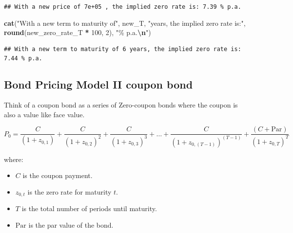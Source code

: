 \documentclass[
]{book}
\newenvironment{Shaded}{\begin{snugshade}}{\end{snugshade}}
\newcommand{\DecValTok}[1]{\textcolor[rgb]{0.00,0.00,0.81}{#1}}
\newcommand{\FunctionTok}[1]{\textcolor[rgb]{0.13,0.29,0.53}{\textbf{#1}}}
\newcommand{\NormalTok}[1]{#1}
\newcommand{\SpecialCharTok}[1]{\textcolor[rgb]{0.81,0.36,0.00}{\textbf{#1}}}
\newcommand{\StringTok}[1]{\textcolor[rgb]{0.31,0.60,0.02}{#1}}
\providecommand{\tightlist}{%
  \setlength{\itemsep}{0pt}\setlength{\parskip}{0pt}}
\begin{document}
\begin{verbatim}
## With a new price of 7e+05 , the implied zero rate is: 7.39 % p.a.
\end{verbatim}

\begin{Shaded}
\begin{Highlighting}[]
\FunctionTok{cat}\NormalTok{(}\StringTok{"With a new term to maturity of"}\NormalTok{, new\_T, }\StringTok{"years, the implied zero rate is:"}\NormalTok{, }\FunctionTok{round}\NormalTok{(new\_zero\_rate\_T }\SpecialCharTok{*} \DecValTok{100}\NormalTok{, }\DecValTok{2}\NormalTok{), }\StringTok{"\% p.a.}\SpecialCharTok{\textbackslash{}n}\StringTok{"}\NormalTok{)}
\end{Highlighting}
\end{Shaded}

\begin{verbatim}
## With a new term to maturity of 6 years, the implied zero rate is: 7.44 % p.a.
\end{verbatim}

\hypertarget{bond-pricing-model-ii-coupon-bond}{%
\subsection{Bond Pricing Model II coupon
bond}\label{bond-pricing-model-ii-coupon-bond}}

Think of a coupon bond as a series of Zero-coupon bonds where the coupon
is also a value like face value.

\[
P_0 = \frac{C}{(1 + z_{0,1})} + \frac{C}{(1 + z_{0,2})^2} + \frac{C}{(1 + z_{0,3})^3} + \ldots + \frac{C}{(1 + z_{0,(T-1)})^{(T-1)}} + \frac{(C + \text{Par})}{(1 + z_{0,T})^T}
\]

where:

\begin{itemize}
\tightlist
\item
  \(C\) is the coupon payment.
\item
  \(z_{0,t}\) is the zero rate for maturity \(t\).
\item
  \(T\) is the total number of periods until maturity.
\item
  \(\text{Par}\) is the par value of the bond.
\end{itemize}
\end{document}
